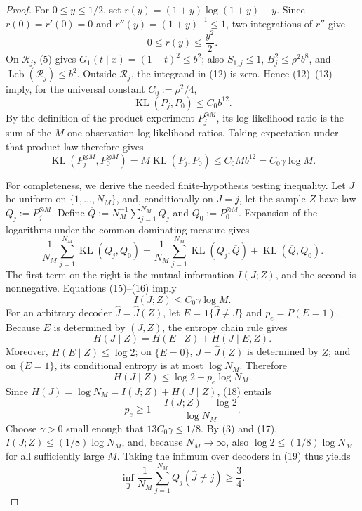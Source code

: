 \documentclass{article}
\begin{document}
\begin{proof}
For \(0\le y\le1/2\), set \(r(y)=(1+y)\log(1+y)-y\).  Since \(r(0)=r'(0)=0\) and \(r''(y)=(1+y)^{-1}\le1\), two integrations of \(r''\) give
\[
 0\le r(y)\le\frac{y^2}{2}.                              \tag{13}
\]
On \(\mathcal R_j\), (5) gives \(G_1(t\mid x)=(1-t)^2\le b^2\); also \(S_{1,j}\le1\), \(B_j^2\le\rho^2b^8\), and \(\operatorname{Leb}(\mathcal R_j)\le b^2\).  Outside \(\mathcal R_j\), the integrand in (12) is zero.  Hence (12)--(13) imply, for the universal constant \(C_0:=\rho^2/4\),
\[
 \operatorname{KL}(P_j,P_0)\le C_0b^{12}.                 \tag{14}
\]
By the definition of the product experiment \(P_j^{\otimes M}\), its log likelihood ratio is the sum of the \(M\) one-observation log likelihood ratios.  Taking expectation under that product law therefore gives
\[
 \operatorname{KL}(P_j^{\otimes M},P_0^{\otimes M})
 =M\operatorname{KL}(P_j,P_0)
 \le C_0Mb^{12}=C_0\gamma\log M.                          \tag{15}
\]

For completeness, we derive the needed finite-hypothesis testing inequality.  Let \(J\) be uniform on \(\{1,\ldots,N_M\}\), and, conditionally on \(J=j\), let the sample \(Z\) have law \(Q_j:=P_j^{\otimes M}\).  Define \(\overline Q:=N_M^{-1}\sum_{j=1}^{N_M}Q_j\) and \(Q_0:=P_0^{\otimes M}\).  Expansion of the logarithms under the common dominating measure gives
\[
 \frac1{N_M}\sum_{j=1}^{N_M}\operatorname{KL}(Q_j,Q_0)
 =\frac1{N_M}\sum_{j=1}^{N_M}\operatorname{KL}(Q_j,\overline Q)
  +\operatorname{KL}(\overline Q,Q_0).                    \tag{16}
\]
The first term on the right is the mutual information \(I(J;Z)\), and the second is nonnegative.  Equations (15)--(16) imply
\[
 I(J;Z)\le C_0\gamma\log M.                              \tag{17}
\]
For an arbitrary decoder \(\widehat J=\widehat J(Z)\), let \(E=\mathbf 1\{\widehat J\ne J\}\) and \(p_e=P(E=1)\).  Because \(E\) is determined by \((J,Z)\), the entropy chain rule gives
\[
 H(J\mid Z)=H(E\mid Z)+H(J\mid E,Z).
\]
Moreover, \(H(E\mid Z)\le\log2\); on \(\{E=0\}\), \(J=\widehat J(Z)\) is determined by \(Z\); and on \(\{E=1\}\), its conditional entropy is at most \(\log N_M\).  Therefore
\[
 H(J\mid Z)\le\log2+p_e\log N_M.                         \tag{18}
\]
Since \(H(J)=\log N_M=I(J;Z)+H(J\mid Z)\), (18) entails
\[
 p_e\ge1-\frac{I(J;Z)+\log2}{\log N_M}.                  \tag{19}
\]
Choose \(\gamma>0\) small enough that \(13C_0\gamma\le1/8\).  By (3) and (17), \(I(J;Z)\le(1/8)\log N_M\), and, because \(N_M\to\infty\), also \(\log2\le(1/8)\log N_M\) for all sufficiently large \(M\).  Taking the infimum over decoders in (19) thus yields
\[
 \inf_{\widehat J}\frac1{N_M}\sum_{j=1}^{N_M}
 Q_j(\widehat J\ne j)\ge\frac34.                         \tag{20}
\]


\end{proof}
\end{document}
